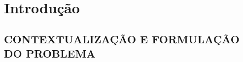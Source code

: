 \chapter[INTRODUÇÃO]{\textbf {Introdução}}
\section{CONTEXTUALIZAÇÃO E FORMULAÇÃO DO PROBLEMA}


\begin{comment}
No campo da reabilitação humana, há o subcampo que trata da construção de próteses. 
Estas têm como objetivo substituir a função de algum membro do corpo humano. 
Em especial existem próteses que substituem a função de parte das pernas, abaixo ou acima do joelho, também chamadas de próteses transtibiais para aquelas e transfemurais para estas.

As próteses também podem ser classificadas como passivas ou ativas. As passivas são compostas inerentemente por componentes mecânicos como molas e alavancas. 
Já as próteses ativas possuem mecanismos eletroeletrônicas, que têm como principal função injetar energia no sistema para compensar o gasto metabólico extra, exigido por uma prótese passiva. 
Para as próteses ativas, faz-se necessária a criação de mecanismos de controle para as mesmas.
Este mecanismo pode ser criado, usando-se engenharia de controle tradicional e/ou adaptativa, ou sistemas inteligentes, que permitem visualizar o projeto de controle para próteses \cite{Borjian2008}. 

As técnicas de engenharia de controle \cite{Golnaraghi2010} exigem que se criem modelos cinéticos e/ou cinemáticos para se resolver o problema em questão. 
Em \citeonline{Borjian2008} há um exemplo de tal enfoque. 
Geralmente estes modelos são criados analiticamente, usando-se leis bem compreendidas da física \cite{Garcia2009a}.
Este não é um trabalho fácil, podendo demandar muito tempo para construção e às vezes devido a grande complexidade do sistema, exige um grau maior de simplificação.
Isso pode se tornar um problema sério, até mesmo inviabilizando a solução.

Sistemas inteligentes \cite{Russel2010} abrangem vários tipos de tecnologias.
Dentre elas, sistemas \emph{fuzzy}, sistemas especialistas, agentes lógicos, redes neurais artificiais, etc.
Esta classe de sistemas, pode facilitar bastante a gestão da complexidade, pois dependendo do caso, os modelos são bastante simples de serem construídos, pois não exigiriam toda a complexidade física e matemática da engenharia de controle.


\end{comment}

